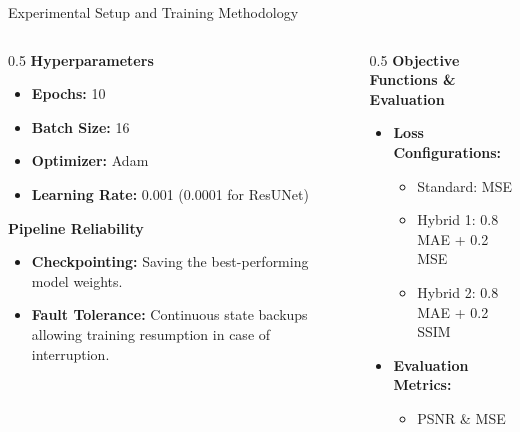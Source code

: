 \documentclass[10pt, handout]{beamer}
\begin{document}
\begin{frame}{Experimental Setup and Training Methodology}
    \vspace{0.2cm}
    \begin{columns}[T]
        
        \begin{column}{0.5\textwidth}
            \textbf{Hyperparameters}
            \begin{itemize}
                \item \textbf{Epochs:} 10
                \item \textbf{Batch Size:} 16
                \item \textbf{Optimizer:} Adam
                \item \textbf{Learning Rate:} 0.001 (0.0001 for ResUNet)
            \end{itemize}
            
            \vspace{0.4cm}
            \textbf{Pipeline Reliability}
            \begin{itemize}
                \item \textbf{Checkpointing:} Saving the best-performing model weights.
                \item \textbf{Fault Tolerance:} Continuous state backups allowing training resumption in case of interruption.
            \end{itemize}
        \end{column}
        
        \begin{column}{0.5\textwidth}
            \textbf{Objective Functions \& Evaluation}
            \begin{itemize}
                \item \textbf{Loss Configurations:}
                \begin{itemize}
                    \item Standard: MSE
                    \item Hybrid 1: 0.8 MAE + 0.2 MSE
                    \item Hybrid 2: 0.8 MAE + 0.2 SSIM
                \end{itemize}
                
                \vspace{0.2cm}
                \item \textbf{Evaluation Metrics:} 
                \begin{itemize}
                    \item PSNR \& MSE
                \end{itemize}


\end{itemize}
\end{column}
\end{columns}
\end{frame}
\end{document}
